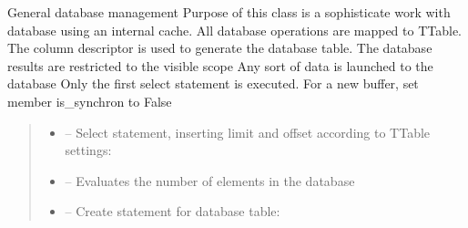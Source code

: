 \documentclass[letterpaper,10pt,english]{sphinxmanual}
\begin{document}
\begin{savenotes}
\begin{fulllineitems}
\sphinxAtStartPar
General database management
Purpose of this class is a sophisticate work with database using an internal cache. All database
operations are mapped to TTable. The column descriptor is used to generate the database table.
The database results are restricted to the visible scope
Any sort of data is launched to the database
Only the first select statement is executed. For a new buffer, set member is\_synchron to False
\begin{quote}\begin{description}
\begin{itemize}
\item {} 
\sphinxAtStartPar
{} – Select statement, inserting limit and offset according to TTable settings:

\item {} 
\sphinxAtStartPar
{} – Evaluates the number of elements in the database 

\item {} 
\sphinxAtStartPar
{} – Create statement for database table:

\end{itemize}

\end{description}\end{quote}


\end{fulllineitems}
\end{savenotes}
\end{document}
